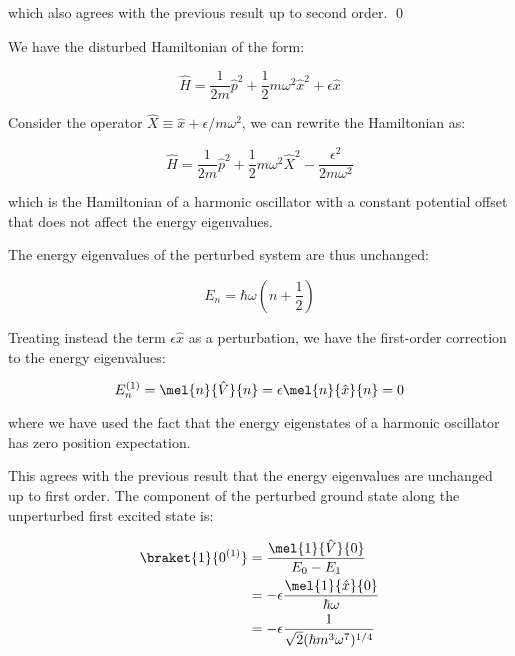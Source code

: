\documentclass[12pt]{article}
\begin{document}
which also agrees with the previous result up to second order.
\qed


We have the disturbed Hamiltonian of the form:

\begin{equation}
    \hat{H} = \frac{1}{2m} \hat{p}^{2} + \frac{1}{2} m\omega^{2} \hat{x}^{2} + \epsilon \hat{x}
\end{equation}

Consider the operator $\hat{X} \equiv \hat{x} + \epsilon/m\omega^{2}$, we can rewrite the Hamiltonian as:

\begin{equation}
    \hat{H} = \frac{1}{2m} \hat{p}^{2} + \frac{1}{2} m\omega^{2} \hat{X}^{2} - \frac{\epsilon^{2}}{2m \omega^{2}}
\end{equation}

which is the Hamiltonian of a harmonic oscillator with a constant potential offset that does not affect the energy eigenvalues.

The energy eigenvalues of the perturbed system are thus unchanged:

\begin{equation}
    E_{n} = \hbar \omega \left( n + \frac{1}{2} \right)
\end{equation}

Treating instead the term $\epsilon \hat{x}$ as a perturbation, we have the first-order correction to the energy eigenvalues:

\begin{equation}
    E_{n}^{(1)} = \mel{n}{\hat{V}}{n} = \epsilon \mel{n}{\hat{x}}{n} = 0
\end{equation}

where we have used the fact that the energy eigenstates of a harmonic oscillator has zero position expectation.

This agrees with the previous result that the energy eigenvalues are unchanged up to first order. The component of the perturbed ground state along the unperturbed first excited state is:

\begin{equation}
    \begin{split}
        \braket{1}{0^{(1)}} &= \frac{\mel{1}{\hat{V}}{0}}{E_{0} - E_{1}} \\
        &= -\epsilon \frac{\mel{1}{\hat{x}}{0}}{\hbar \omega} \\
        &= -\epsilon \frac{1}{\sqrt{2} (\hbar m^{3} \omega^{7})^{1/4}}
    \end{split}
\end{equation}
\end{document}
